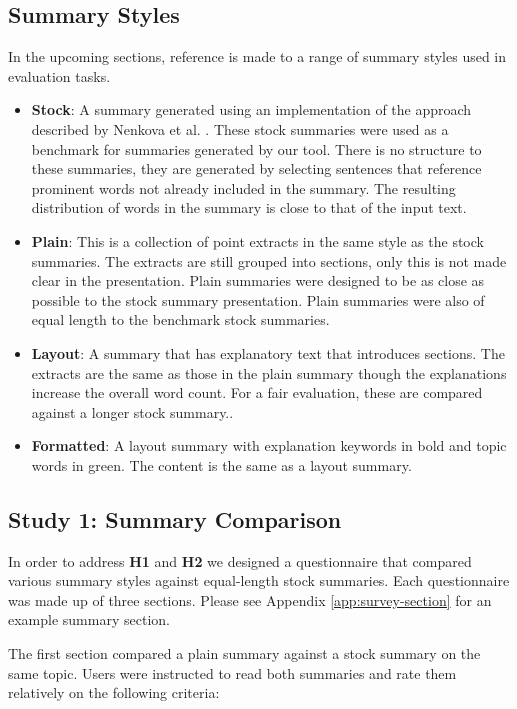     \tocless\subsection{Summary Styles}
      In the upcoming sections, reference is made to a range of summary styles used in evaluation tasks.
      \begin{itemize}
        \item{\textbf{Stock}: A summary generated using an implementation of the approach described by Nenkova et al. \cite{nenkova2006compositional}. These stock summaries were used as a benchmark for summaries generated by our tool. There is no structure to these summaries, they are generated by selecting sentences that reference prominent words not already included in the summary. The resulting distribution of words in the summary is close to that of the input text.}
        \item{\textbf{Plain}: This is a collection of point extracts in the same style as the stock summaries. The extracts are still grouped into sections, only this is not made clear in the presentation. Plain summaries were designed to be as close as possible to the stock summary presentation. Plain summaries were also of equal length to the benchmark stock summaries.}
        \item{\textbf{Layout}: A summary that has explanatory text that introduces sections. The extracts are the same as those in the plain summary though the explanations increase the overall word count. For a fair evaluation, these are compared against a longer stock summary..}
        \item{\textbf{Formatted}: A layout summary with explanation keywords in bold and topic words in green. The content is the same as a layout summary.}
      \end{itemize}

    \tocless\subsection{Study 1: Summary Comparison\label{sec:stud1}}
      In order to address \textbf{H1} and \textbf{H2} we designed a questionnaire that compared various summary styles against equal-length stock summaries. Each questionnaire was made up of three sections. Please see Appendix \ref{app:survey-section} for an example summary section.

      The first section compared a plain summary against a stock summary on the same topic. Users were instructed to read both summaries and rate them relatively on the following criteria:

